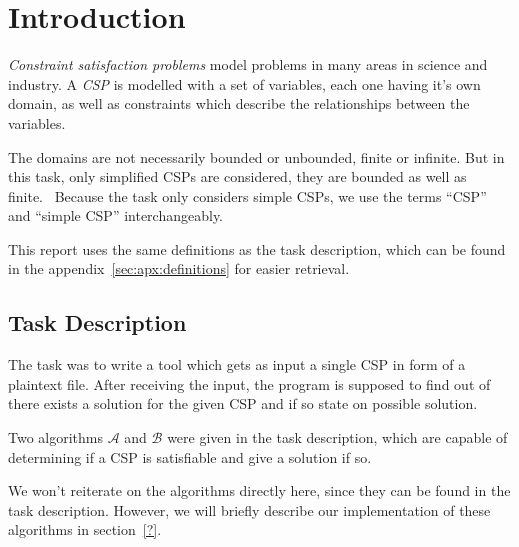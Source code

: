 \section{Introduction}

\emph{Constraint satisfaction problems} model problems in many areas in science and industry.
A \emph{CSP} is modelled with a set of variables, each one having it's own domain, as well as constraints which describe the relationships between the variables.~\cite{MF19}

The domains are not necessarily bounded or unbounded, finite or infinite.
But in this task, only simplified CSPs are considered, they are bounded as well as finite.~\cite{MF19}
Because the task only considers simple CSPs, we use the terms ``CSP'' and ``simple CSP'' interchangeably.

This report uses the same definitions as the task description, which can be found in the appendix~\ref{sec:apx:definitions} for easier retrieval.

\subsection{Task Description}

The task was to write a tool which gets as input a single CSP in form of a plaintext file.
After receiving the input, the program is supposed to find out of there exists a solution for the given CSP and if so state on possible solution.

Two algorithms $\mathcal{A}$ and $\mathcal{B}$ were given in the task description, which are capable of determining if a CSP is satisfiable and give a solution if so.

We won't reiterate on the algorithms directly here, since they can be found in the task description.
However, we will briefly describe our implementation of these algorithms in section~\ref{?}.
